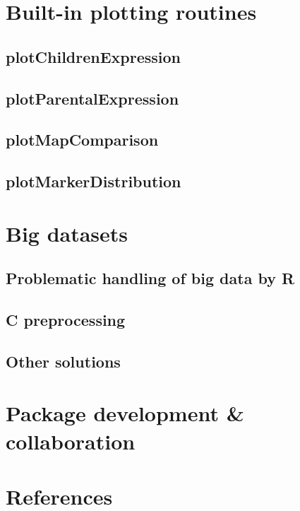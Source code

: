 \documentclass{article}
\begin{document}
\newpage
\section{Built-in plotting routines}
\subsection{plotChildrenExpression}
\blindtext[2]
\subsection{plotParentalExpression}
\blindtext[2]
\subsection{plotMapComparison}
\blindtext[2]
\subsection{plotMarkerDistribution}
\blindtext[2]
\newpage
\section{Big datasets}

\subsection{Problematic handling of big data by R}
\blindtext
\subsection{C preprocessing}
\blindtext
\subsection{Other solutions}
\blindtext

\newpage
\section{Package development \& collaboration}
\newpage
\section{References}


\end{document}
